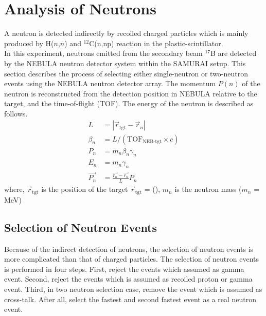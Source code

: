 \section{Analysis of Neutrons}
A neutron is detected indirectly by recoiled charged particles which is mainly produced by H($n$,$n$) and ${}^{12}$C(n,np) reaction in the plastic-scintillator. \\
\indent In this experiment, neutrons emitted from the secondary beam ${}^{17}$B are detected by the NEBULA neutron detector system within the SAMURAI setup.  This section describes the process of selecting either single-neutron or two-neutron events using the NEBULA neutron detector array. The momentum $P(n)$ of the neutron is reconstructed from the detection position in NEBULA relative to the target, and the time-of-flight (TOF). The energy of the neutron is described as follows.
\begin{align}
    L &= | \vec{r}_{\text{tgt}} - \vec{r}_{n} | \\
    \beta_{n} &= L / (\text{TOF}_{\text{NEB-tgt}} \times c) \\
    P_{n} &= m_{n} \beta_{n} \gamma_{n} \\
    E_{n} &= m_{n} \gamma_{n} \\
    \vec{P_{n}} &= \frac{\vec{r_{n}} - \vec{r_{n}}}{L} P_{n}
\end{align}
where, $\vec{r}_{\text{tgt}}$ is the position of the target $\vec{r}_{\text{tgt}}$ = (), $m_{n}$ is the neutron mass ($m_n$ = MeV)

\subsection{Selection of Neutron Events}
Because of the indirect detection of neutrons, the selection of neutron events is more complicated than that of charged particles. The selection of neutron events is performed in four steps. First, reject the events which assumed as gamma event. Second, reject the events which is assumed as recoiled proton or gamma event. Third, in two neutron selection case, remove the event which is assumed as cross-talk. After all, select the fastest and second fastest event as a real neutron event. 

